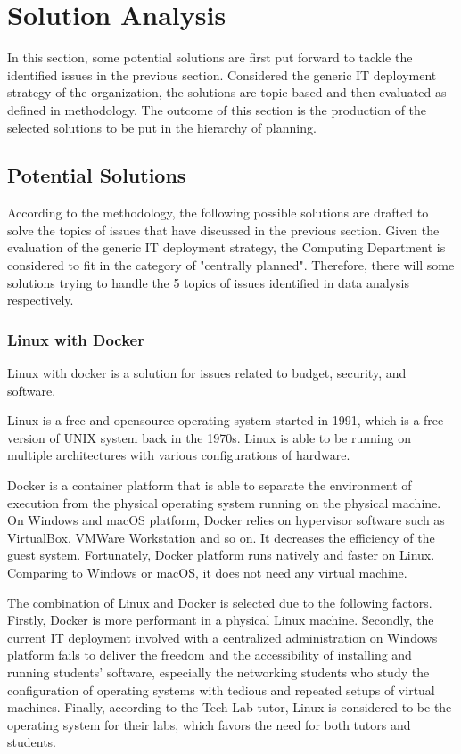 
\section{Solution Analysis}

In this section, some potential solutions are first put forward to tackle the identified issues in the previous section. Considered the generic IT deployment strategy of the organization, the solutions are topic based and then evaluated as defined in methodology. The outcome of this section is the production of the selected solutions to be put in the hierarchy of planning.

\subsection{Potential Solutions}

According to the methodology, the following possible solutions are drafted to solve the topics of issues that have discussed in the previous section. Given the evaluation of the generic IT deployment strategy, the Computing Department is considered to fit in the category of "centrally planned". Therefore, there will some solutions trying to handle the 5 topics of issues identified in data analysis respectively.

\subsubsection{Linux with Docker}
Linux with docker is a solution for issues related to budget, security, and software.

Linux is a free and opensource operating system started in 1991, which is a free version of UNIX system back in the 1970s. Linux is able to be running on multiple architectures with various configurations of hardware.

Docker is a container platform that is able to separate the environment of execution from the physical operating system running on the physical machine. On Windows and macOS platform, Docker relies on hypervisor software such as VirtualBox, VMWare Workstation and so on. It decreases the efficiency of the guest system. Fortunately, Docker platform runs natively and faster on Linux. Comparing to Windows or macOS, it does not need any virtual machine.

The combination of Linux and Docker is selected due to the following factors. Firstly, Docker is more performant in a physical Linux machine. Secondly, the current IT deployment involved with a centralized administration on Windows platform fails to deliver the freedom and the accessibility of installing and running students' software, especially the networking students who study the configuration of operating systems with tedious and repeated setups of virtual machines. Finally, according to the Tech Lab tutor, Linux is considered to be the operating system for their labs, which favors the need for both tutors and students.

